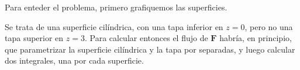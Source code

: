 \begin{solution}
    Para enteder el problema, primero grafiquemos las superficies.
    \begin{center}
    \end{center}
    Se trata de una superficie cilíndrica, con una tapa inferior en $z=0$, pero no una tapa superior en $z=3$.
    Para calcular entonces el flujo de $\mathbf{F}$ habría, en principio, que parametrizar la superficie cilíndrica y la
    tapa por separadas, y luego calcular dos integrales, una por cada superficie.


\end{solution}
